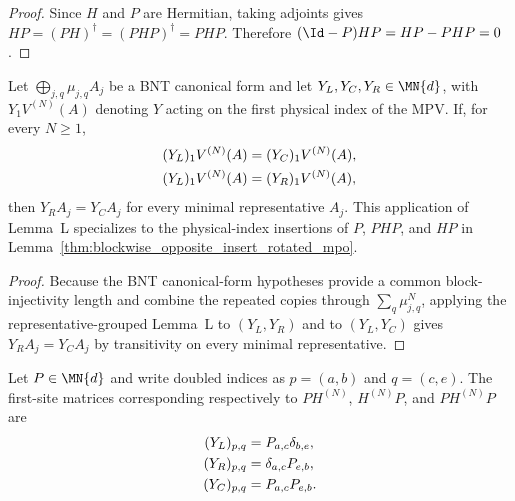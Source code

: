 \begin{proof}
    \leanok
    Since $H$ and $P$ are Hermitian, taking adjoints gives
    $HP=(PH)^\dagger=(PHP)^\dagger=PHP$.
    Therefore $(\Id-P)HP=HP-PHP=0$.
\end{proof}

\begin{lemma}
    \label{thm:blockwise_opposite_insert_eq}
    \leanok
    Let $\bigoplus_{j,q}\mu_{j,q}A_j$ be a BNT canonical form and let
    $Y_L,Y_C,Y_R\in \MN{d}$, with $Y_1V^{(N)}(A)$ denoting $Y$ acting on the
    first physical index of the MPV. If, for every $N\geq1$,
    \begin{align}
        (Y_L)_1V^{(N)}(A)
         & =(Y_C)_1V^{(N)}(A),
        \notag                 \\
        (Y_L)_1V^{(N)}(A)
         & =(Y_R)_1V^{(N)}(A),
        \notag
    \end{align}
    then $Y_RA_j=Y_CA_j$ for every minimal representative $A_j$. This application of
    Lemma~L specializes to the physical-index insertions of $P$, $PHP$, and $HP$ in
    Lemma~\ref{thm:blockwise_opposite_insert_rotated_mpo}.
\end{lemma}

\begin{proof}
    \leanok
    Because the BNT canonical-form hypotheses provide a common
    block-injectivity length and combine the repeated copies through
    $\sum_q\mu_{j,q}^{N}$, applying the representative-grouped Lemma~L to
    $(Y_L,Y_R)$ and to $(Y_L,Y_C)$ gives $Y_RA_j=Y_CA_j$ by transitivity on
    every minimal representative.
\end{proof}

\begin{definition}
    \label{def:mpdo_three_first_site_contractions}
    \leanok
    Let $P\in \MN{d}$ and write doubled indices as $p=(a,b)$ and
    $q=(c,e)$. The first-site matrices corresponding respectively to
    $PH^{(N)}$, $H^{(N)}P$, and $PH^{(N)}P$ are
    \begin{align}
        (Y_L)_{p,q}
         & =P_{a,c}\delta_{b,e},
        \notag                   \\
        (Y_R)_{p,q}
         & =\delta_{a,c}P_{e,b},
        \notag                   \\
        (Y_C)_{p,q}
         & =P_{a,c}P_{e,b}.
        \notag
    \end{align}
\end{definition}

